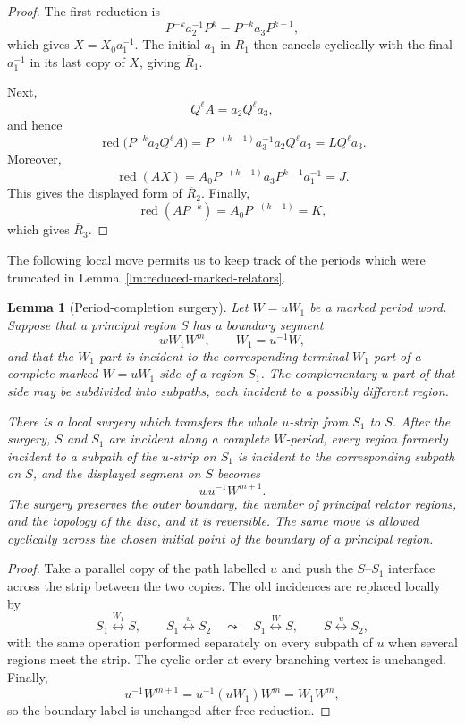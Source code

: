 \documentclass{article}
\newtheorem{lm}[theorem]{Lemma}
\begin{document}
\begin{proof}
The first reduction is
\[
 P^{-k}a_2^{-1}P^k
 =P^{-k}a_3P^{k-1},
\]
which gives $X=X_0a_1^{-1}$.  The initial $a_1$ in $R_1$ then cancels
cyclically with the final $a_1^{-1}$ in its last copy of $X$, giving
$\overline R_1$.

Next,
\[
 Q^{\ell}A=a_2Q^{\ell}a_3,
\]
and hence
\[
 \operatorname{red}\bigl(P^{-k}a_2Q^{\ell}A\bigr)
 =P^{-(k-1)}a_3^{-1}a_2Q^{\ell}a_3
 =LQ^{\ell}a_3.
\]
Moreover,
\[
 \operatorname{red}(AX)
 =A_0P^{-(k-1)}a_3P^{k-1}a_1^{-1}
 =J.
\]
This gives the displayed form of $\overline R_2$.  Finally,
\[
 \operatorname{red}(AP^{-k})=A_0P^{-(k-1)}=K,
\]
which gives $\overline R_3$.
\end{proof}

The following local move permits us to keep track of the periods which were
truncated in Lemma~\ref{lm:reduced-marked-relators}.

\begin{lm}[Period-completion surgery]\label{lm:period-completion-surgery}
Let $W=uW_1$ be a marked period word.  Suppose that a principal region $S$
has a boundary segment
\[
        wW_1W^m,
        \qquad W_1=u^{-1}W,
\]
and that the $W_1$-part is incident to the corresponding terminal $W_1$-part
of a complete marked $W=uW_1$-side of a region $S_1$.  The complementary
$u$-part of that side may be subdivided into subpaths, each incident to a
possibly different region.

There is a local surgery which transfers the whole $u$-strip from $S_1$ to
$S$.  After the surgery, $S$ and $S_1$ are incident along a complete
$W$-period, every region formerly incident to a subpath of the $u$-strip on
$S_1$ is incident to the corresponding subpath on $S$, and the displayed
segment on $S$ becomes
\[
        wu^{-1}W^{m+1}.
\]
The surgery preserves the outer boundary, the number of principal relator
regions, and the topology of the disc, and it is reversible.  The same move
is allowed cyclically across the chosen initial point of the boundary of a
principal region.
\end{lm}

\begin{proof}
Take a parallel copy of the path labelled $u$ and push the $S$--$S_1$
interface across the strip between the two copies.  The old incidences are
replaced locally by
\[
 S_1\stackrel{W_1}{\longleftrightarrow}S,
 \qquad
 S_1\stackrel{u}{\longleftrightarrow}S_2
 \quad\leadsto\quad
 S_1\stackrel{W}{\longleftrightarrow}S,
 \qquad
 S\stackrel{u}{\longleftrightarrow}S_2,
\]
with the same operation performed separately on every subpath of $u$ when
several regions meet the strip.  The cyclic order at every branching vertex
is unchanged.  Finally,
\[
        u^{-1}W^{m+1}=u^{-1}(uW_1)W^m=W_1W^m,
\]
so the boundary label is unchanged after free reduction.
\end{proof}
\end{document}
